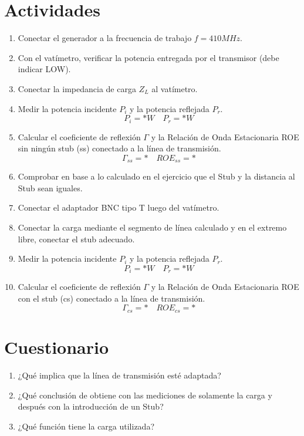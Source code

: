   \section{Actividades}
    \begin{enumerate}
      \item Conectar el generador a la frecuencia de trabajo $f = 410 MHz$.
      \item Con el vatímetro, verificar la potencia entregada por el transmisor (debe indicar LOW).
      \item Conectar la impedancia de carga $Z_L$ al vatímetro.
      \item Medir la potencia incidente $P_i$  y la potencia reflejada $P_r$.
        \begin{equation*}
          P_i = *W \quad P_r = *W
        \end{equation*}
      \item Calcular el coeficiente de reflexión $\Gamma$ y la Relación de Onda Estacionaria ROE sin ningún stub (ss) conectado a la línea de transmisión.
        \begin{equation*}
          \Gamma_{ss} = * \quad ROE_{ss} = *
        \end{equation*}
      \item Comprobar en base a lo calculado en el ejercicio que el Stub y la distancia al Stub sean iguales.
      \item Conectar el adaptador BNC tipo T luego del vatímetro.
      \item Conectar la carga mediante el segmento de línea calculado y en el extremo libre, conectar el stub adecuado.
      \item Medir la potencia incidente $P_i$  y la potencia reflejada $P_r$.
        \begin{equation*}
          P_i = *W \quad P_r = *W
        \end{equation*}
      \item Calcular el coeficiente de reflexión $\Gamma$ y la Relación de Onda Estacionaria ROE con el stub (cs) conectado a la línea de transmisión.
        \begin{equation*}
          \Gamma_{cs} = * \quad ROE_{cs} = *
        \end{equation*}
    \end{enumerate}

  \section{Cuestionario}
    \begin{enumerate}
      \item ¿Qué implica que la línea de transmisión esté adaptada?
      \item ¿Qué conclusión de obtiene con las mediciones de solamente la carga y después con la introducción de un Stub?
      \item ¿Qué función tiene la carga utilizada?
    \end{enumerate}
